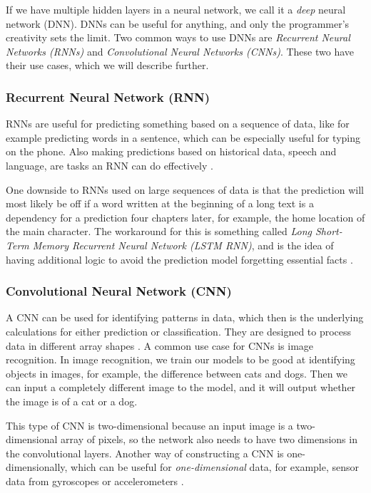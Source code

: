 If we have multiple hidden layers in a neural network, we call it a \textit{deep} neural network (DNN). DNNs can be useful for anything, and only the programmer's creativity sets the limit. Two common ways to use DNNs are \textit{Recurrent Neural Networks (RNNs)} and \textit{Convolutional Neural Networks (CNNs)}. These two have their use cases, which we will describe further.

\subsubsection{Recurrent Neural Network (RNN)}
RNNs are useful for predicting something based on a sequence of data, like for example predicting words in a sentence, which can be especially useful for typing on the phone. Also making predictions based on historical data, speech and language, are tasks an RNN can do effectively \cite{deep_learning}.

One downside to RNNs used on large sequences of data is that the prediction will most likely be off if a word written at the beginning of a long text is a dependency for a prediction four chapters later, for example, the home location of the main character. The workaround for this is something called \textit{Long Short-Term Memory Recurrent Neural Network (LSTM RNN)}, and is the idea of having additional logic to avoid the prediction model forgetting essential facts \cite{deep_learning}.

\subsubsection{Convolutional Neural Network (CNN)}
A CNN can be used for identifying patterns in data, which then is the underlying calculations for either prediction or classification. They are designed to process data in different array shapes \cite{deep_learning}. A common use case for CNNs is image recognition. In image recognition, we train our models to be good at identifying objects in images, for example, the difference between cats and dogs. Then we can input a completely different image to the model, and it will output whether the image is of a cat or a dog. 

This type of CNN is two-dimensional because an input image is a two-dimensional array of pixels, so the network also needs to have two dimensions in the convolutional layers. Another way of constructing a CNN is one-dimensionally, which can be useful for \textit{one-dimensional} data, for example, sensor data from gyroscopes or accelerometers \cite{deep_learning}.

